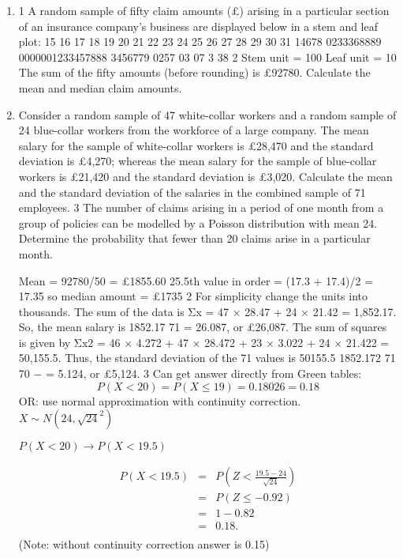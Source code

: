 \documentclass[a4paper,12pt]{article}
\begin{document}
\begin{enumerate}
\item 1 A random sample of fifty claim amounts (£) arising in a particular section of an
insurance company's business are displayed below in a stem and leaf plot:
15
16
17
18
19
20
21
22
23
24
25
26
27
28
29
30
31
14678
0233368889
0000001233457888
3456779
0257
03
07
3
38
2
Stem unit = 100
Leaf unit = 10
The sum of the fifty amounts (before rounding) is £92780.
Calculate the mean and median claim amounts. 
\item Consider a random sample of 47 white-collar workers and a random sample of 24 blue-collar workers from the workforce of a large company. The mean salary for
the sample of white-collar workers is £28,470 and the standard deviation is £4,270; whereas the mean salary for the sample of blue-collar workers is £21,420
and the standard deviation is £3,020.
Calculate the mean and the standard deviation of the salaries in the combined
sample of 71 employees. 
3 The number of claims arising in a period of one month from a group of policies
can be modelled by a Poisson distribution with mean 24.
Determine the probability that fewer than 20 claims arise in a particular month.



 Mean = 92780/50 = £1855.60
25.5th value in order = (17.3 + 17.4)/2 = 17.35 so median amount = £1735
2 For simplicity change the units into thousands. The sum of the data is
Σx = 47 × 28.47 + 24 × 21.42 = 1,852.17.
So, the mean salary is 1852.17
71 = 26.087, or £26,087.
The sum of squares is given by
Σx2 = {46 × 4.272 + 47 × 28.472} + {23 × 3.022 + 24 × 21.422} = 50,155.5.
Thus, the standard deviation of the 71 values is
50155.5 1852.172 71
70
−
= 5.124, or £5,124.
3 Can get answer directly from Green tables:
\[P(X < 20) = P(X \leq 19) = 0.18026 = 0.18\]
OR: use normal approximation with continuity correction.
$X \sim  N(24, \sqrt{24}^2 )$

$P(X < 20) \rightarrow P(X < 19.5)$

\begin{eqnarray*}
P(X < 19.5) &=& P \left( Z < \frac{19.5-24}{\sqrt{24}} \right) \\ 
&=& P\left(Z \leq -0.92 \right) \\
&=&  1 − 0.82 \\
&=&  0.18.\\
\end{eqnarray*}
(Note: without continuity correction answer is 0.15)




\end{enumerate}
\end{document}
